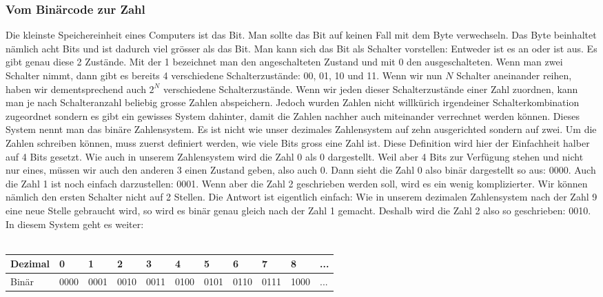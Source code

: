 \subsubsection{Vom Binärcode zur Zahl}
Die kleinste Speichereinheit eines Computers ist das Bit. Man sollte das Bit auf keinen Fall mit dem Byte verwechseln. Das Byte beinhaltet nämlich acht Bits und ist dadurch viel grösser als das Bit. Man kann sich das Bit als Schalter vorstellen: Entweder ist es an oder ist aus. Es gibt genau diese 2 Zustände. Mit der 1 bezeichnet man den angeschalteten Zustand und mit 0 den ausgeschalteten. Wenn man zwei Schalter nimmt, dann gibt es bereits 4 verschiedene Schalterzustände: 00, 01, 10 und 11. Wenn wir nun $N$ Schalter aneinander reihen, haben wir dementsprechend auch $2^N$ verschiedene Schalterzustände. Wenn wir jeden dieser Schalterzustände einer Zahl zuordnen, kann man je nach Schalteranzahl beliebig grosse Zahlen abspeichern. Jedoch wurden Zahlen nicht willkürich irgendeiner Schalterkombination zugeordnet sondern es gibt ein gewisses System dahinter, damit die Zahlen nachher auch miteinander verrechnet werden können. Dieses System nennt man das binäre Zahlensystem. Es ist nicht wie unser dezimales Zahlensystem auf zehn ausgerichted sondern auf zwei. Um die Zahlen schreiben können, muss zuerst definiert werden, wie viele Bits gross eine Zahl ist. Diese Definition wird hier der Einfachheit halber auf 4 Bits gesetzt. Wie auch in unserem Zahlensystem wird die Zahl 0 als 0 dargestellt. Weil aber 4 Bits zur Verfügung stehen und nicht nur eines, müssen wir auch den anderen 3 einen Zustand geben, also auch 0. Dann sieht die Zahl 0 also binär dargestellt so aus: 0000. Auch die Zahl 1 ist noch einfach darzustellen: 0001. Wenn aber die Zahl 2 geschrieben werden soll, wird es ein wenig komplizierter. Wir können nämlich den ersten Schalter nicht auf 2 Stellen. Die Antwort ist eigentlich einfach: Wie in unserem dezimalen Zahlensystem nach der Zahl 9 eine neue Stelle gebraucht wird, so wird es binär genau gleich nach der Zahl 1 gemacht. Deshalb wird die Zahl 2 also so geschrieben: 0010. In diesem System geht es weiter: \\
\\
\begin{tabular}{l|l|l|l|l|l|l|l|l|l|l}
Dezimal & 0 & 1 & 2 & 3 & 4 & 5 & 6 & 7 & 8 &  ...\\ \hline
Binär & 0000 & 0001 & 0010 & 0011 & 0100 & 0101 & 0110 & 0111 & 1000 & ...\\
\end{tabular}  \\
